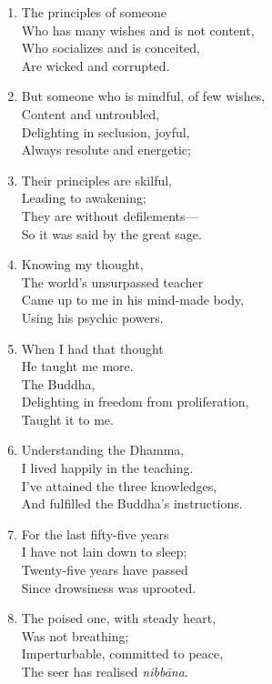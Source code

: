 \documentclass[10pt, openany]{book}
\begin{document}
\begin{enumerate}
\item The principles of someone\\
Who has many wishes and is not content,\\
Who socializes and is conceited,\\
Are wicked and corrupted.

\item But someone who is mindful, of few wishes,\\
Content and untroubled,\\
Delighting in seclusion, joyful,\\
Always resolute and energetic;

\item Their principles are skilful,\\
Leading to awakening;\\
They are without defilements—\\
So it was said by the great sage.

\item Knowing my thought,\\
The world’s unsurpassed teacher\\
Came up to me in his mind-made body,\\
Using his psychic powers.

\item When I had that thought\\
He taught me more.\\
The Buddha, \\
Delighting in freedom from proliferation,\\
Taught it to me.

\item Understanding the Dhamma,\\
I lived happily in the teaching.\\
I’ve attained the three knowledges,\\
And fulfilled the Buddha’s instructions.

\item For the last fifty-five years\\
I have not lain down to sleep;\\
Twenty-five years have passed\\
Since drowsiness was uprooted.

\item The poised one, with steady heart,\\
Was not breathing;\\
Imperturbable, committed to peace,\\
The seer has realised \emph{nibbāna}.


\end{enumerate}
\end{document}
